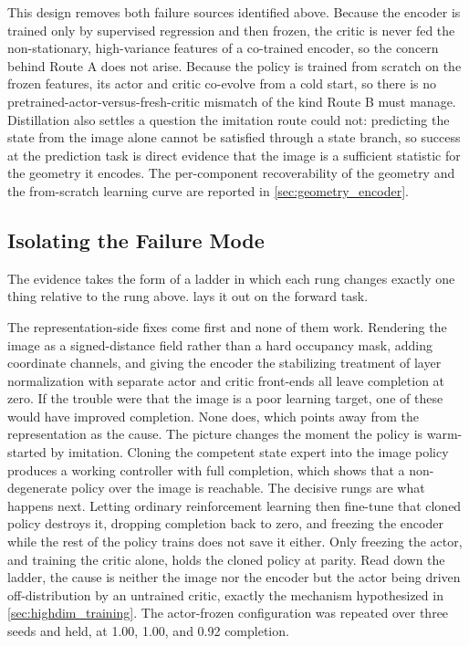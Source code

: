 This design removes both failure sources identified above. Because the encoder is trained only by supervised regression and then frozen, the critic is never fed the non-stationary, high-variance features of a co-trained encoder, so the concern behind Route A does not arise. Because the policy is trained from scratch on the frozen features, its actor and critic co-evolve from a cold start, so there is no pretrained-actor-versus-fresh-critic mismatch of the kind Route B must manage. Distillation also settles a question the imitation route could not: predicting the state from the image alone cannot be satisfied through a state branch, so success at the prediction task is direct evidence that the image is a sufficient statistic for the geometry it encodes. The per-component recoverability of the geometry and the from-scratch learning curve are reported in \cref{sec:geometry_encoder}.

\subsection{Isolating the Failure Mode}
\label{sec:causal_ladder}

The evidence takes the form of a ladder in which each rung changes exactly one thing relative to the rung above.  lays it out on the forward task.



The representation-side fixes come first and none of them work. Rendering the image as a signed-distance field rather than a hard occupancy mask, adding coordinate channels, and giving the encoder the stabilizing treatment of layer normalization with separate actor and critic front-ends all leave completion at zero. If the trouble were that the image is a poor learning target, one of these would have improved completion. None does, which points away from the representation as the cause. The picture changes the moment the policy is warm-started by imitation. Cloning the competent state expert into the image policy produces a working controller with full completion, which shows that a non-degenerate policy over the image is reachable. The decisive rungs are what happens next. Letting ordinary reinforcement learning then fine-tune that cloned policy destroys it, dropping completion back to zero, and freezing the encoder while the rest of the policy trains does not save it either. Only freezing the actor, and training the critic alone, holds the cloned policy at parity. Read down the ladder, the cause is neither the image nor the encoder but the actor being driven off-distribution by an untrained critic, exactly the mechanism hypothesized in \cref{sec:highdim_training}. The actor-frozen configuration was repeated over three seeds and held, at 1.00, 1.00, and 0.92 completion.

